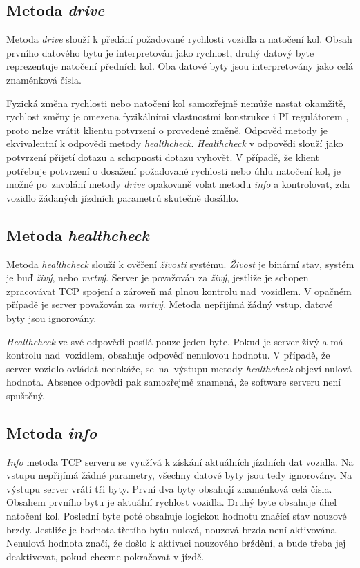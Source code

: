 \documentclass[czech, bachelor]{diploma}
\begin{document}
\subsection{Metoda \emph{drive}}
Metoda \emph{drive} slouží k předání požadované rychlosti vozidla a natočení kol. Obsah prvního datového bytu je interpretován
jako rychlost, druhý datový byte reprezentuje natočení předních kol. Oba datové byty jsou interpretovány jako celá znaménková
čísla.

Fyzická změna rychlosti nebo natočení kol samozřejmě nemůže nastat okamžitě, rychlost změny je omezena fyzikálními vlastnostmi
konstrukce i PI regulátorem \cite{pid-controller-source}, proto nelze vrátit klientu potvrzení o provedené změně. Odpověd metody
je ekvivalentní k odpovědi metody \emph{healthcheck}. \emph{Healthcheck} v odpovědi slouží jako potvrzení přijetí dotazu a
schopnosti dotazu vyhovět. V případě, že klient potřebuje potvrzení o dosažení požadované rychlosti nebo úhlu natočení kol, je
možné po~zavolání metody \emph{drive} opakovaně volat metodu \emph{info} a kontrolovat, zda vozidlo žádaných jízdních parametrů
skutečně dosáhlo.

\subsection{Metoda \emph{healthcheck}}
Metoda \emph{healthcheck} slouží k ověření \emph{živosti} systému. \emph{Živost} je binární stav, systém je buď \emph{živý}, nebo
\emph{mrtvý}. Server je považován za \emph{živý}, jestliže je schopen zpracovávat TCP spojení a zároveň má plnou kontrolu
nad~vozidlem. V opačném případě je server považován za \emph{mrtvý}. Metoda nepřijímá žádný vstup, datové byty jsou ignorovány.

\emph{Healthcheck} ve své odpovědi posílá pouze jeden byte. Pokud je server živý a má kontrolu nad~vozidlem, obsahuje odpověď
nenulovou hodnotu. V případě, že server vozidlo ovládat nedokáže, se~na~výstupu metody \emph{healthcheck} objeví nulová hodnota.
Absence odpovědi pak samozřejmě znamená, že software serveru není spuštěný.

\subsection{Metoda \emph{info}}
\emph{Info} metoda TCP serveru se využívá k získání aktuálních jízdních dat vozidla. Na vstupu nepřijímá žádné parametry, všechny
datové byty jsou tedy ignorovány. Na výstupu server vrátí tři byty. První dva byty obsahují znaménková celá čísla. Obsahem prvního
bytu je aktuální rychlost vozidla. Druhý byte obsahuje úhel natočení kol. Poslední byte poté obsahuje logickou hodnotu značící
stav nouzové brzdy. Jestliže je hodnota třetího bytu nulová, nouzová brzda není aktivována. Nenulová hodnota značí, že došlo
k aktivaci nouzového brždění, a bude třeba jej deaktivovat, pokud chceme pokračovat v jízdě.
\end{document}
